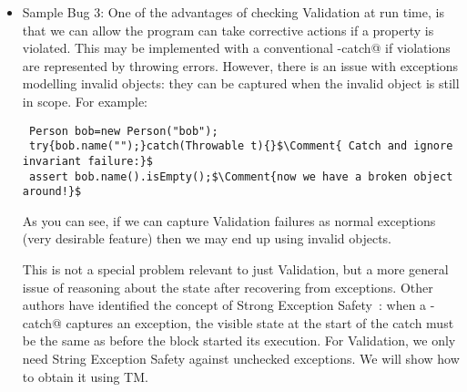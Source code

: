 \begin{itemize}
\item Sample Bug 3:
One of the advantages of checking Validation at run time, is that
we can allow the program can take corrective actions if a property is violated.
This may be implemented with a conventional \Q@try-catch@ if violations are represented by throwing errors.
However, there is an issue with exceptions modelling invalid objects: they can be captured when the invalid object is still in scope. For example:
\saveSpace
\begin{lstlisting}
 Person bob=new Person("bob");
 try{bob.name("");}catch(Throwable t){}$\Comment{ Catch and ignore invariant failure:}$
 assert bob.name().isEmpty();$\Comment{now we have a broken object around!}$
\end{lstlisting}
\saveSpace
As you can see, if we can capture Validation failures as normal exceptions (very desirable feature) then we may end up using invalid objects.

This is not a special problem relevant to just Validation, but a more general issue of reasoning about the state after recovering from exceptions.
Other authors have identified the concept of Strong Exception Safety~\cite{Abrahams2000}:
when a \Q@try-catch@ captures an exception, the visible state at the start of the catch must be the same as before the \Q@try@ block started its execution.
For Validation, we only need String Exception Safety against unchecked exceptions. We will show how to obtain it using TM.
\end{itemize}








